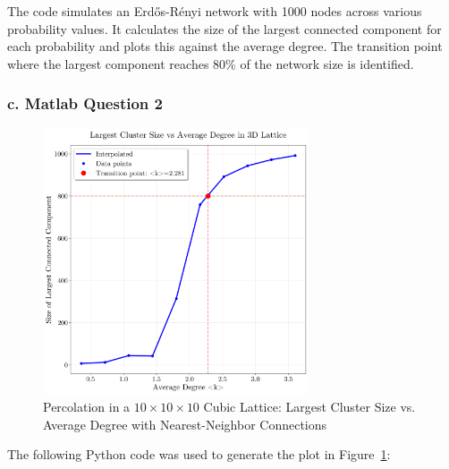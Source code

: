 \documentclass{article}
\begin{document}
The code simulates an Erdős-Rényi network with 1000 nodes across various
probability values. It calculates the size of the largest connected component
for each probability and plots this against the average degree. The transition
point where the largest component reaches 80\% of the network size is
identified.

\newpage
\subsubsection*{c. Matlab Question 2}
\begin{figure}[htbp]
    \centering
    \includegraphics[width=0.7\textwidth]{figures/3c.png}
    \caption{\centering Percolation in a $10 \times 10 \times 10$ Cubic Lattice: Largest Cluster Size vs. Average Degree with Nearest-Neighbor Connections}\label{fig:3c}
\end{figure}

The following Python code was used to generate the plot in Figure~\ref{fig:3c}:
\end{document}
